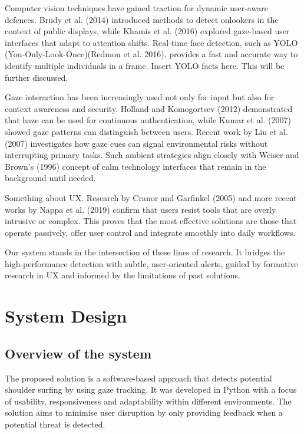 \documentclass[12pt]{article}
\theoremstyle{plain}
\theoremstyle{definition}
\begin{document}
Computer vision techniques have gained traction for dynamic user-aware defences. Brudy et al. (2014) introduced methods to detect onlookers in the context of public displays, while Khamis et al. (2016) explored gaze-based user interfaces that adapt to attention shifts. Real-time face detection, such as YOLO (You-Only-Look-Once)(Redmon et al. 2016), provides a fast and accurate way to identify multiple individuals in a frame. Insert YOLO facts here. This will be further discussed.

Gaze interaction has been increasingly used not only for input but also for context awareness and security. Holland and Komogortsev (2012) demonstrated that haze can be used for continuous authentication, while Kumar et al. (2007) showed gaze patterns can distinguish between users. Recent work by Liu et al. (2007) investigates how gaze cues can signal environmental risks without interrupting primary tasks. Such ambient strategies align closely with Weiser and Brown’s (1996) concept of calm technology interfaces that remain in the background until needed.

Something about UX. Research by Cranor and Garfinkel (2005) and more recent works by Nappa et al. (2019) confirm that users resist tools that are overly intrusive or complex. This proves that the most effective solutions are those that operate passively, offer user control and integrate smoothly into daily workflows.

Our system stands in the intersection of these lines of research. It bridges the high-performance detection with subtle, user-oriented alerts, guided by formative research in UX and informed by the limitations of past solutions.

\section{System Design}
\label{sec:system design}

\subsection{Overview of the system}
\label{sec:Overview of the system}

The proposed solution is a software-based approach that detects potential shoulder surfing by using gaze tracking. It was developed in Python with a focus of usability, responsiveness and adaptability within different environments. The solution aims to minimise user disruption by only providing feedback when a potential threat is detected.
\end{document}
